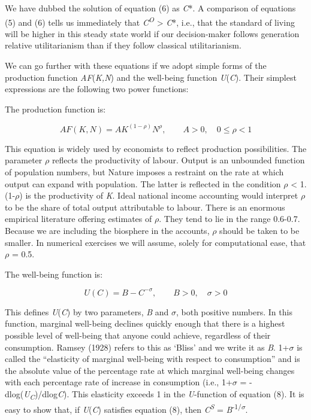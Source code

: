 \documentclass[man,11pt,a4paper,floatsintext]{apa7}
\begin{document}
\noindent We have dubbed the solution of equation (6) as \textit{C}*. A comparison of equations (5) and (6) tells us immediately that \textit{C}\textsuperscript{\textit{O}} \textgreater{} \textit{C}*, i.e., that the standard of living will be higher in this steady state world if our decision-maker follows generation relative utilitarianism than if they follow classical utilitarianism.

We can go further with these equations if we adopt simple forms of the production function \textit{AF}(\textit{K,N}) and the well-being function \textit{U}(\textit{C}). Their simplest expressions are the following two power functions:

The production function is:

\begin{equation}
AF(K,N) = AK^{(1-\rho)}N^{\rho}, \qquad A > 0, \quad 0 \le \rho < 1
\tag{7}
\end{equation}

\noindent This equation is widely used by economists to reflect production possibilities. The parameter $\rho$ reflects the productivity of labour. Output is an unbounded function of population numbers, but Nature imposes a restraint on the rate at which output can expand with population. The latter is reflected in the condition $\rho$ \textless{} 1. (1-$\rho$) is the productivity of \textit{K}. Ideal national income accounting would interpret $\rho$ to be the share of total output attributable to labour. There is an enormous empirical literature offering estimates of $\rho$. They tend to lie in the range 0.6-0.7. Because we are including the biosphere in the accounts, $\rho$ should be taken to be smaller. In numerical exercises we will assume, solely for computational ease, that $\rho$ = 0.5.

The well-being function is:

\begin{equation}
U(C) = B-C^{-\sigma}, \qquad B > 0, \quad \sigma > 0
\tag{8}
\end{equation}

\noindent This defines \textit{U}(\textit{C}) by two parameters, \textit{B} and $\sigma$, both positive numbers. In this function, marginal well-being declines quickly enough that there is a highest possible level of well-being that anyone could achieve, regardless of their consumption. Ramsey (1928) refers to this as `Bliss' and we write it as \textit{B}. 1+$\sigma$ is called the ``elasticity of marginal well-being with respect to consumption'' and is the absolute value of the percentage rate at which marginal well-being changes with each percentage rate of increase in consumption (i.e., 1+$\sigma$ = -dlog(\textit{U}\textsubscript{\textit{C}})/dlog\textit{C}). This elasticity exceeds 1 in the \textit{U}-function of equation (8). It is easy to show that, if \textit{U}(\textit{C}) satisfies equation (8), then \textit{C}\textsuperscript{\textit{S}} = \textit{B}\textsuperscript{-1/$\sigma$}.
\end{document}
